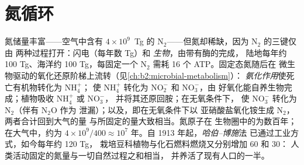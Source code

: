 \section{氮循环}

\begin{proposition}[氮循环]\label{prop:b2:biogeochemical-cycles:nitrogen}
氮储量丰富——空气中含有 $4\times 10^{9}$~Tg 的
$\mathrm{N_2}$——但氮却稀缺，因为 $\mathrm{N_2}$ 的三键仅由
两种过程打开：闪电（每年数 Tg）和
\emph{生物}，由带有酶的完成，
陆地每年约 100 Tg、海洋约 100 Tg，每固定一个
$\mathrm{N_2}$ 需耗 16 个 ATP。固定态氮随后在
微生物驱动的氧化还原阶梯上流转（见\cref{ch:b2:microbial-metabolism}）：
\emph{氨化作用}使死亡有机物转化为 $\mathrm{NH_4^{+}}$；
\emph{}使 $\mathrm{NH_4^{+}}$ 转化为 $\mathrm{NO_2^{-}}$ 和 $\mathrm{NO_3^{-}}$，由
好氧化能自养生物完成；植物吸收 $\mathrm{NH_4^{+}}$ 或 $\mathrm{NO_3^{-}}$，
并将其还原回胺；在无氧条件下，
\emph{}使 $\mathrm{NO_3^{-}}$ 转化为 $\mathrm{N_2}$（伴有 $\mathrm{N_2O}$ 作为
泄漏）；以及\emph{}，即在无氧条件下以
亚硝酸盐氧化铵生成 $\mathrm{N_2}$，两者合计回到大气的量
与所固定的量大致相当。氮原子在
生物圈中的为数百年；在大气中，约为 $4\times
10^{9}/400 \approx 10^{7}$ 年。自 1913 年起，\emph{哈伯–博施}法
已通过工业方式，如今每年约 120 Tg，
栽培豆科植物与化石燃料燃烧又分别增加 60 和 30：
人类活动固定的氮量与一切自然过程之和相当，
并养活了现有人口的一半。
\end{proposition}

